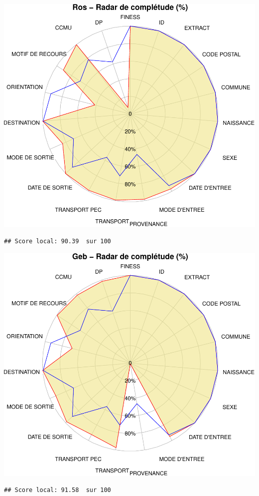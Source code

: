 \documentclass[]{article}
\begin{document}
\includegraphics{completude_files/figure-latex/finess-11.pdf}

\begin{verbatim}
## Score local: 90.39  sur 100
\end{verbatim}

\includegraphics{completude_files/figure-latex/finess-12.pdf}

\begin{verbatim}
## Score local: 91.58  sur 100
\end{verbatim}
\end{document}
